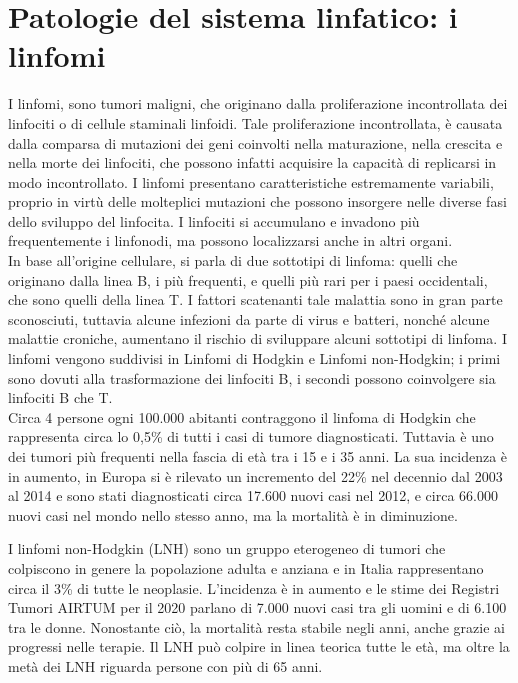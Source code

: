 \section{Patologie del sistema linfatico: i linfomi}
I linfomi, sono tumori maligni, che originano dalla proliferazione incontrollata
dei linfociti o di cellule staminali linfoidi. Tale proliferazione incontrollata,
è causata dalla comparsa di mutazioni dei geni coinvolti nella maturazione,
nella crescita e nella morte dei linfociti, che possono infatti acquisire la capacità
di replicarsi in modo incontrollato. 
I linfomi presentano caratteristiche estremamente variabili, proprio in virtù delle molteplici
mutazioni che possono insorgere nelle diverse fasi dello sviluppo del linfocita. 
I linfociti si accumulano e invadono più frequentemente i linfonodi, ma possono localizzarsi anche in altri organi.\\

In base all'origine cellulare, si parla di due sottotipi di linfoma:
quelli che originano dalla linea B, i più frequenti, e quelli più rari per i paesi occidentali,
che sono quelli della linea T. 
I fattori scatenanti tale malattia sono in gran parte sconosciuti, tuttavia alcune infezioni
da parte di virus e batteri, nonché alcune malattie croniche, aumentano il rischio di sviluppare alcuni sottotipi di linfoma.
I linfomi vengono suddivisi in Linfomi di Hodgkin e Linfomi non-Hodgkin; i primi sono dovuti alla trasformazione
dei linfociti B, i secondi possono coinvolgere sia linfociti B che T.\\

Circa 4 persone ogni 100.000 abitanti contraggono il linfoma di Hodgkin
che rappresenta circa lo 0,5\% di tutti i casi di tumore diagnosticati.
Tuttavia è uno dei tumori più frequenti nella fascia di età tra i 15 e i 35 anni. 
La sua incidenza è in aumento, in Europa si è rilevato un incremento del 22\%
nel decennio dal 2003 al 2014 e sono stati diagnosticati circa 17.600 nuovi casi
nel 2012, e circa 66.000 nuovi casi nel mondo nello stesso anno, ma la mortalità è in diminuzione.

I linfomi non-Hodgkin (LNH) sono un gruppo eterogeneo di tumori che colpiscono
in genere la popolazione adulta e anziana e in Italia rappresentano circa il 3\% di tutte le neoplasie. 
L'incidenza è in aumento e le stime dei Registri Tumori AIRTUM per il 2020 parlano
di 7.000 nuovi casi tra gli uomini e di 6.100 tra le donne. Nonostante ciò,
la mortalità resta stabile negli anni, anche grazie ai progressi nelle terapie. 
Il LNH può colpire in linea teorica tutte le età, ma oltre la metà dei LNH riguarda persone con più di 65 anni.\\

